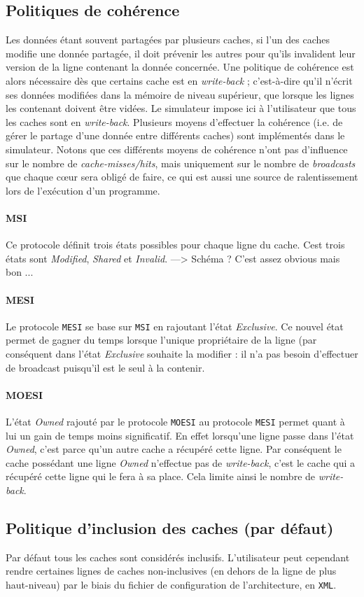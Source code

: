 \subsection{Politiques de cohérence}

Les données étant souvent partagées par plusieurs caches, si l'un des caches modifie une donnée partagée, il doit prévenir les autres pour qu'ils invalident leur version de la ligne contenant la donnée concernée. Une politique de cohérence est alors nécessaire dès  que certains cache est en \emph{write-back} ; c'est-à-dire qu'il n'écrit ses données modifiées dans la mémoire de niveau supérieur, que lorsque les lignes les contenant doivent être vidées. Le simulateur impose ici à l'utilisateur que tous les caches sont en \emph{write-back}.
Plusieurs moyens d'effectuer la cohérence (i.e. de gérer le partage d'une donnée entre différents caches) sont implémentés dans le simulateur. Notons que ces différents moyens de cohérence n'ont pas d'influence sur le nombre de \emph{cache-misses/hits}, mais uniquement sur le nombre de \emph{broadcasts} que chaque c\oe ur sera obligé de faire, ce qui est aussi une source de ralentissement lors de l'exécution d'un programme. 

\paragraph{MSI} Ce protocole définit trois états possibles pour chaque ligne du cache. Cest trois états sont \emph{Modified}, \emph{Shared} et \emph{Invalid}. ---> Schéma ? C'est assez obvious mais bon ...

\paragraph{MESI} Le protocole \texttt{MESI} se base sur \texttt{MSI} en rajoutant l'état \emph{Exclusive}. Ce nouvel état permet de gagner du temps lorsque l'unique propriétaire de la ligne (par conséquent dans l'état \emph{Exclusive} souhaite la modifier : il n'a pas besoin d'effectuer de broadcast puisqu'il est le seul à la contenir.

\paragraph{MOESI} L'état \emph{Owned} rajouté par le protocole \texttt{MOESI} au protocole \texttt{MESI} permet quant à lui un gain de temps moins significatif. En effet lorsqu'une ligne passe dans l'état \emph{Owned}, c'est parce qu'un autre cache a récupéré cette ligne. Par conséquent le cache possédant une ligne \emph{Owned} n'effectue pas de \emph{write-back}, c'est le cache qui a récupéré cette ligne qui le fera à sa place. Cela limite ainsi le nombre de \emph{write-back}.

\subsection{Politique d'inclusion des caches (par défaut)}

Par défaut tous les caches sont considérés inclusifs. L'utilisateur peut cependant rendre certaines lignes de caches non-inclusives (en dehors de la ligne de plus haut-niveau) par le biais du fichier de configuration de l'architecture, en \texttt{XML}.
